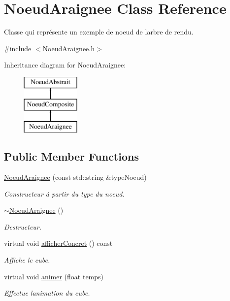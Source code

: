\hypertarget{class_noeud_araignee}{}\section{Noeud\+Araignee Class Reference}
\label{class_noeud_araignee}


Classe qui représente un exemple de noeud de l\textquotesingle{}arbre de rendu.  




{\ttfamily \#include $<$Noeud\+Araignee.\+h$>$}

Inheritance diagram for Noeud\+Araignee\+:\begin{figure}[H]
\begin{center}
\leavevmode
\includegraphics[height=3.000000cm]{class_noeud_araignee}
\end{center}
\end{figure}
\subsection*{Public Member Functions}
\begin{DoxyCompactItemize}
\item 
\hyperlink{group__inf2990_ga0ca3d14d5baf9c6879ac53918cc54ba5}{Noeud\+Araignee} (const std\+::string \&type\+Noeud)
\begin{DoxyCompactList}\small\item\em Constructeur à partir du type du noeud. \end{DoxyCompactList}\item 
\hyperlink{group__inf2990_ga78bf0250c601da26edb8cd8f2cddec10}{$\sim$\+Noeud\+Araignee} ()
\begin{DoxyCompactList}\small\item\em Destructeur. \end{DoxyCompactList}\item 
virtual void \hyperlink{group__inf2990_ga4f9e7fbb424a0cb18e01ab12a092fc02}{afficher\+Concret} () const 
\begin{DoxyCompactList}\small\item\em Affiche le cube. \end{DoxyCompactList}\item 
\hypertarget{group__inf2990_gae3f4c490330d597a18975014c06a05ca}{}virtual void \hyperlink{group__inf2990_gae3f4c490330d597a18975014c06a05ca}{animer} (float temps)\label{group__inf2990_gae3f4c490330d597a18975014c06a05ca}

\begin{DoxyCompactList}\small\item\em Effectue l\textquotesingle{}animation du cube. \end{DoxyCompactList}\end{DoxyCompactItemize}
